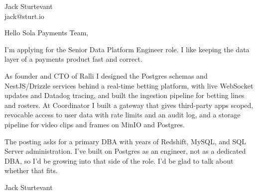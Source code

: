 \documentclass[11pt]{article}
\begin{document}
\raggedright

{\namefont\fontsize{20pt}{24pt}\selectfont Jack Sturtevant}\\[-0.3em]
jack@sturt.io

\vspace{1.2em}

Hello Sola Payments Team,

I'm applying for the Senior Data Platform Engineer role. I like keeping the data layer of a payments product fast and correct.

As founder and CTO of Ralli I designed the Postgres schemas and NestJS/Drizzle services behind a real-time betting platform, with live WebSocket updates and Datadog tracing, and built the ingestion pipeline for betting lines and rosters. At Coordinator I built a gateway that gives third-party apps scoped, revocable access to user data with rate limits and an audit log, and a storage pipeline for video clips and frames on MinIO and Postgres.

The posting asks for a primary DBA with years of Redshift, MySQL, and SQL Server administration. I've built on Postgres as an engineer, not as a dedicated DBA, so I'd be growing into that side of the role. I'd be glad to talk about whether that fits.

\vspace{0.6em}
Jack Sturtevant
\end{document}
